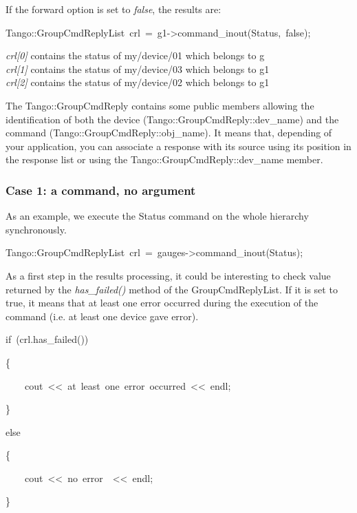If the forward option is set to \emph{false}, the results are:
\begin{lyxcode}
Tango::GroupCmdReplyList~crl~=~g1->command\_inout(\textquotedbl{}Status\textquotedbl{},~false);~
\end{lyxcode}
\emph{crl{[}0{]}} contains the status of my/device/01 which belongs
to g \\
\emph{crl{[}1{]}} contains the status of my/device/03 which belongs
to g1\\
\emph{crl{[}2{]}} contains the status of my/device/02 which belongs
to g1

The Tango::GroupCmdReply contains some public members allowing the
identification of both the device (Tango::GroupCmdReply::dev\_name)
and the command (Tango::GroupCmdReply::obj\_name).
It means that, depending of your application, you can associate a
response with its source using its position in the response list or
using the Tango::GroupCmdReply::dev\_name member.

\subsubsection{Case 1: a command, no argument\label{subsec:Case-1}}

As an example, we execute the Status command on the whole hierarchy
synchronously.
\begin{lyxcode}
Tango::GroupCmdReplyList~crl~=~gauges->command\_inout(\textquotedbl{}Status\textquotedbl{});
\end{lyxcode}
As a first step in the results processing, it could be interesting
to check value returned by the \emph{has\_failed()}
method of the GroupCmdReplyList. If it is
set to true, it means that at least one error occurred during the
execution of the command (i.e. at least one device gave error).


\begin{lyxcode}
if~(crl.has\_failed())

\{

~~~~cout~<\textcompwordmark{}<~\textquotedbl{}at~least~one~error~occurred\textquotedbl{}~<\textcompwordmark{}<~endl;

\}

else

\{

~~~~cout~<\textcompwordmark{}<~\textquotedbl{}no~error~\textquotedbl{}~<\textcompwordmark{}<~endl;

\}
\end{lyxcode}


